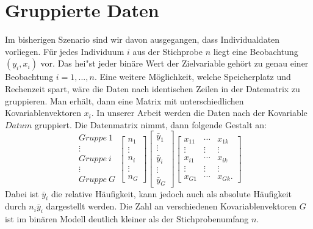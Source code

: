 \documentclass[12pt]{scrreprt}
\begin{document}
\section{Gruppierte Daten}
Im bisherigen Szenario sind wir davon ausgegangen, dass Individualdaten vorliegen. Für jedes Individuum $i$ aus der Stichprobe $n$ liegt eine Beobachtung $(y_{i},x_{i})$ vor.  Das hei"st jeder binäre Wert der Zielvariable gehört zu genau einer Beobachtung $i=1,...,n$. Eine weitere Möglichkeit, welche Speicherplatz und Rechenzeit spart, wäre die Daten nach identischen Zeilen in der Datematrix zu gruppieren. Man erhält, dann eine Matrix mit unterschiedlichen Kovariablenvektoren $x_{i}$. In unserer Arbeit werden die Daten nach der Kovariable $Datum$ gruppiert. Die Datenmatrix nimmt, dann folgende Gestalt an:
\begin{equation}
 \begin{matrix}
 Gruppe ~1 \\
 \vdots \\
 Gruppe ~i \\
 \vdots \\
 Gruppe ~G
 \end{matrix}
 \begin{bmatrix}
 n_{1} \\
 \vdots \\
 n_{i} \\
 \vdots \\
 n_{G}
 \end{bmatrix}
  \begin{bmatrix}
 \bar y_{1} \\
 \vdots \\
 \bar y_{i} \\
 \vdots \\
 \bar y_{G}
 \end{bmatrix}
 \begin{bmatrix}
 x_{11} & \cdots & x_{1k} \\
 \vdots & \vdots & \vdots \\
 x_{i1} & \cdots & x_{ik} \\
 \vdots & \vdots & \vdots \\
 x_{G1} & \cdots & x_{Gk}.
 \end{bmatrix}
\end{equation}
Dabei ist $\bar y_{i}$ die relative Häufigkeit, kann jedoch auch als absolute Häufigkeit durch $n_{i}\bar y_{i}$ dargestellt werden. Die Zahl an verschiedenen Kovariablenvektoren $G$ ist im binären Modell deutlich kleiner als der Stichprobenumfang $n$. 
\end{document}
